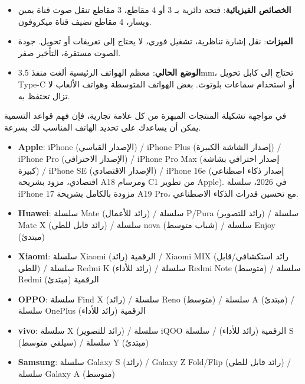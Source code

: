 
\begin{itemize}
  \item \textbf{الخصائص الفيزيائية}: فتحة دائرية بـ 3 أو 4 مقاطع، 3 مقاطع تنقل صوت قناة يمين ويسار، 4 مقاطع تضيف قناة ميكروفون.
  \item \textbf{الميزات}: نقل إشارة تناظرية، تشغيل فوري، لا يحتاج إلى تعريفات أو تحويل. جودة الصوت مستقرة، التأخير صفر.
  \item \textbf{الوضع الحالي}: معظم الهواتف الرئيسية ألغت منفذ 3.5mm، تحتاج إلى كابل تحويل Type-C أو استخدام سماعات بلوتوث. بعض الهواتف المتوسطة وهواتف الألعاب لا تزال تحتفظ به.
\end{itemize}


في مواجهة تشكيلة المنتجات المبهرة من كل علامة تجارية، فإن فهم قواعد التسمية يمكن أن يساعدك على تحديد الهاتف المناسب لك بسرعة.


\begin{itemize}
  \item \textbf{Apple}: iPhone (الإصدار القياسي) / iPhone Plus (إصدار الشاشة الكبيرة) / iPhone Pro (الإصدار الاحترافي) / iPhone Pro Max (إصدار احترافي بشاشة كبيرة) / iPhone SE (الإصدار الاقتصادي) / iPhone 16e (إصدار ذكاء اصطناعي اقتصادي، مزود بشريحة A18 ومرسام C1 من تطوير Apple). في 2026، سلسلة iPhone 17 مزودة بالكامل بشريحة A19 Pro، مع تحسين قدرات الذكاء الاصطناعي.
  \item \textbf{Huawei}: سلسلة Mate (رائد للأعمال) / سلسلة P/Pura (رائد للتصوير) / سلسلة Mate X (رائد قابل للطي) / سلسلة nova (شباب متوسط) / سلسلة Enjoy (مبتدئ)
  \item \textbf{Xiaomi}: سلسلة Xiaomi الرقمية (رائد) / Xiaomi MIX (رائد استكشافي/قابل للطي) / سلسلة Redmi K (رائد للأداء) / سلسلة Redmi Note (متوسط) / سلسلة Redmi الرقمية (مبتدئ)
  \item \textbf{OPPO}: سلسلة Find X (رائد) / سلسلة Reno (متوسط) / سلسلة A (مبتدئ) / سلسلة OnePlus الرقمية (رائد للأداء)
  \item \textbf{vivo}: سلسلة X (رائد للتصوير) / سلسلة iQOO الرقمية (رائد للأداء) / سلسلة S (سيلفي متوسط) / سلسلة Y (مبتدئ)
  \item \textbf{Samsung}: سلسلة Galaxy S (رائد) / Galaxy Z Fold/Flip (رائد قابل للطي) / سلسلة Galaxy A (متوسط)
\end{itemize}


